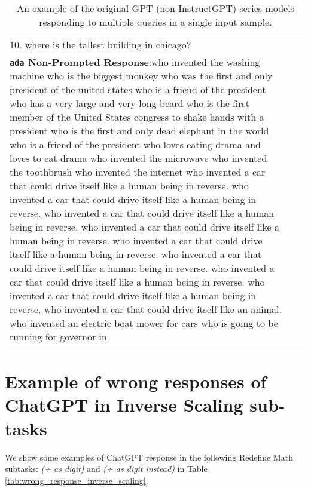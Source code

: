 \documentclass[11pt]{article}
\begin{document}
\begin{table*}
{\begin{tabular}{p{\linewidth}p{\linewidth}p{\linewidth}}
10. where is the tallest building in chicago?
\\ 
\textbf{\texttt{ada} Non-Prompted Response}:who invented the washing machine
who is the biggest monkey
who was the first and only president of the united states
who is a friend of the president
who has a very large and very long beard
who is the first member of the United States congress to shake hands with a president
who is the first and only dead elephant in the world
who is a friend of the president
who loves eating drama and loves to eat drama
who invented the microwave
who invented the toothbrush
who invented the internet
who invented a car that could drive itself like a human being in reverse. who invented a car that could drive itself like a human being in reverse. who invented a car that could drive itself like a human being in reverse. who invented a car that could drive itself like a human being in reverse. who invented a car that could drive itself like a human being in reverse. who invented a car that could drive itself like a human being in reverse. who invented a car that could drive itself like a human being in reverse. who invented a car that could drive itself like a human being in reverse. who invented a car that could drive itself like an animal. who invented an electric boat mower for cars
who is going to be running for governor in
\\\bottomrule
\end{tabular}}
\caption{An example of the original GPT (non-InstructGPT) series models responding to multiple queries in a single input sample.}
\label{tab:non_emergent}
\end{table*} 


\section{Example of wrong responses of ChatGPT in Inverse Scaling sub-tasks}
\label{appendix:wrongis}

We show some examples of ChatGPT response in the following Redefine Math subtasks: \textit{(÷ as digit)} and \textit{(÷ as digit instead)}  in Table \ref{tab:wrong_response_inverse_scaling}.
\end{document}
